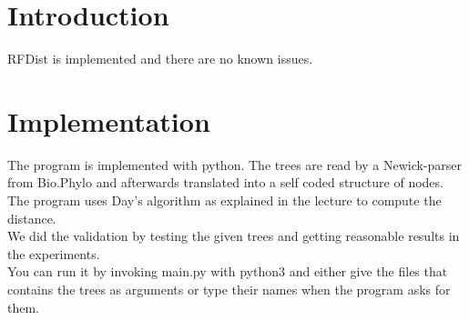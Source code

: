 \documentclass[12pt,a4paper]{article}
\begin{document}
	\section{Introduction}
	RFDist is implemented and there are no known issues.
	\section{Implementation}
	The program is implemented with python. The trees are read by a Newick-parser from Bio.Phylo and afterwards translated into a self coded structure of nodes.\\
	The program uses Day's algorithm as explained in the lecture to compute the distance.\\
	We did the validation by testing the given trees and getting reasonable results in the experiments.\\
	You can run it by invoking main.py with python3 and either give the files that contains the trees as arguments or type their names when the program asks for them.
	
\end{document}
